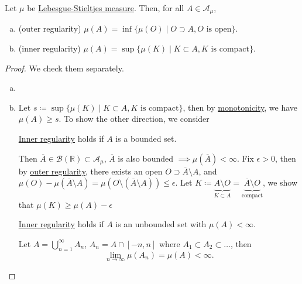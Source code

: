 \begin{theorem}[Regularity]\label{thm:regularity}
	Let \(\mu\) be \hyperref[def:Lebesgue-Stieltjes-measure]{Lebesgue-Stieltjes measure}. Then, for all \(A\in \mathcal{A} _\mu \),
	\begin{enumerate}[(a)]
		\item\label{thm:outer-regularity} (outer regularity) \(\mu (A) = \inf \{\mu (O) \mid O\supset A, O\text{ is open}\}\).
		\item\label{thm:inner-regularity} (inner regularity) \(\mu (A) = \sup \{\mu (K) \mid K\subset A, K\text{ is compact}\}\).
	\end{enumerate}
\end{theorem}
\begin{proof}
	We check them separately.
	\begin{enumerate}[(a)]
		\item {}
		\item Let \(s \coloneqq \sup \{\mu (K) \mid K\subset A, K\text{ is compact} \}\), then by \hyperref[thm:measure-space-monotonicity]{monotonicity}, we have \(\mu (A)\geq s\).
		      To show the other direction, we consider
		      \begin{claim}
			      \hyperref[thm:inner-regularity]{Inner regularity} holds if \(A\) is a bounded set.
		      \end{claim}
		      \begin{explanation}
			      Then \(\overline{A} \in \mathcal{B} (\mathbb{R} )\subset \mathcal{A} _\mu \), \(\overline{A} \) is also bounded \(\implies \mu (\overline{A} ) < \infty \). Fix \(\epsilon >0\), then by \hyperref[thm:outer-regularity]{outer regularity}, there exists an open \(O\supset \overline{A} \setminus A\), and \(\mu (O) - \mu (\overline{A} \setminus A) = \mu (O\setminus (\overline{A} \setminus A))\leq \epsilon \). Let \(K\coloneqq \underbrace{A\setminus O}_{K\subset A} = \underbrace{\overline{A} \setminus O}_{\text{compact}}\), we show that \(\mu (K)\geq \mu (A) - \epsilon\)
		      \end{explanation}

		      \begin{claim}
			      \hyperref[thm:inner-regularity]{Inner regularity} holds if \(A\) is an unbounded set with \(\mu (A)<\infty \).
		      \end{claim}
		      \begin{explanation}
			      Let \(A = \bigcup_{n=1}^{\infty} A_{n}\), \(A_{n} = A\cap [-n, n]\) where
			      \(A_1\subset A_2\subset \dots  \), then
			      \[
				      \lim_{n \to \infty} \mu (A_{n}) = \mu (A) < \infty .
			      \]
		      \end{explanation}


\end{enumerate}
\end{proof}
